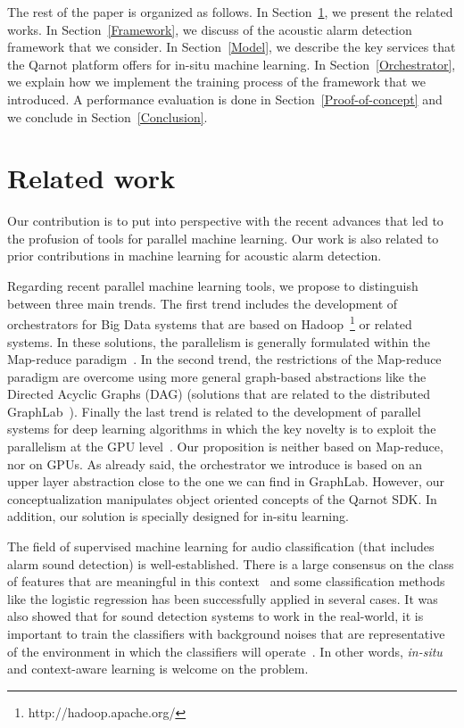 \documentclass[10pt, conference, compsocconf]{IEEEtran}
\begin{document}
The rest of the paper is organized as follows. In Section~\ref{Related}, we present the related works. 
In Section~\ref{Framework}, we discuss of the acoustic alarm detection framework that we consider. In Section~\ref{Model}, we describe 
the key services that the Qarnot platform offers for in-situ machine learning. In Section~\ref{Orchestrator}, we explain 
how we implement the training process of the framework that we introduced. A performance evaluation is done in 
Section~\ref{Proof-of-concept} and we conclude in Section~\ref{Conclusion}.

\section{Related work} \label{Related}

Our contribution is to put into perspective with the recent advances that led to the profusion of tools for parallel 
machine learning. Our work is also related to prior contributions in machine learning for acoustic alarm detection. 

Regarding recent parallel machine learning tools, we propose to distinguish between three main trends. 
The first trend includes the development of orchestrators for Big Data systems that are based on Hadoop~\footnote{http://hadoop.apache.org/} or related systems. 
In these solutions, the parallelism is generally formulated within the Map-reduce paradigm~\cite{DBLP:journals/cacm/DeanG10}. 
In the second trend, the restrictions of the Map-reduce paradigm are overcome using more general graph-based abstractions like 
the Directed Acyclic Graphs (DAG) (solutions that are related to the distributed GraphLab~\cite{Low:2012:DGF:2212351.2212354}).  Finally the last trend is related to the development of parallel systems for deep learning algorithms in which the key novelty is to exploit the parallelism at the GPU level~\cite{Raina:2009:LDU:1553374.1553486}.
Our proposition is neither based on Map-reduce, nor on GPUs. As already said, the orchestrator we introduce 
is based on an upper layer abstraction close to the one we can find in GraphLab. However, our conceptualization manipulates object 
oriented concepts of the Qarnot SDK. In addition, our solution is specially designed for in-situ learning. 

The field of supervised machine learning for audio classification (that includes alarm sound detection) is well-established. There is a large consensus on the class of features that are meaningful in this context~\cite{Mckinney03featuresfor,DBLP:journals/taslp/JoderER09} 
and some classification methods like the logistic regression has been successfully applied in several cases. It was also showed 
that for sound detection systems to work in the real-world, it is important to train the classifiers with 
background noises that are representative of the environment in which the classifiers will operate~\cite{DBLP:conf/icassp/SalamonB15}. 
In other words, {\it in-situ} and context-aware learning is welcome on the problem. 
\end{document}

